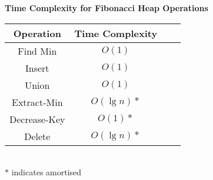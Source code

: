 \begin{center}
	\textbf{Time Complexity for Fibonacci Heap Operations}
 \begin{tabular}{c c c c||} 
 \hline
 Operation & Time Complexity \\ [0.5ex] 
 \hline\hline
 Find Min & $O(1)$ \\ 
 \hline
 Insert & $O(1)$ \\
 \hline
 Union & $O(1)$ \\
 \hline
 Extract-Min & $O(\lg{n})*$ \\
 \hline
 Decrease-Key & $O(1)*$ \\
 \hline
 Delete & $O(\lg{n})*$ \\ [1ex] 
 \hline
\end{tabular}\\
$*$ indicates amortised
\end{center}









